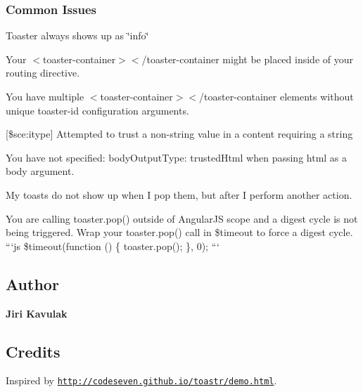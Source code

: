 \subsubsection*{Common Issues}


\begin{DoxyItemize}
\item Toaster always shows up as \char`\"{}info\char`\"{}
\begin{DoxyItemize}
\item Your {\ttfamily $<$toaster-\/container$>$$<$/toaster-\/container} might be placed inside of your routing directive.
\item You have multiple {\ttfamily $<$toaster-\/container$>$$<$/toaster-\/container} elements without unique {\ttfamily toaster-\/id} configuration arguments.
\end{DoxyItemize}
\item \mbox{[}\$sce\+:itype\mbox{]} Attempted to trust a non-\/string value in a content requiring a string
\begin{DoxyItemize}
\item You have not specified\+: {\ttfamily body\+Output\+Type\+: \textquotesingle{}trusted\+Html\textquotesingle{}} when passing html as a body argument.
\end{DoxyItemize}
\item My toasts do not show up when I pop them, but after I perform another action.
\begin{DoxyItemize}
\item You are calling {\ttfamily toaster.\+pop()} outside of Angular\+JS scope and a digest cycle is not being triggered. Wrap your {\ttfamily toaster.\+pop()} call in {\ttfamily \$timeout} to force a digest cycle. ```js \$timeout(function () \{ toaster.\+pop(); \}, 0); ```
\end{DoxyItemize}
\end{DoxyItemize}

\subsection*{Author}

{\bfseries Jiri Kavulak}

\subsection*{Credits}

Inspired by \href{http://codeseven.github.io/toastr/demo.html}{\tt http\+://codeseven.\+github.\+io/toastr/demo.\+html}.

